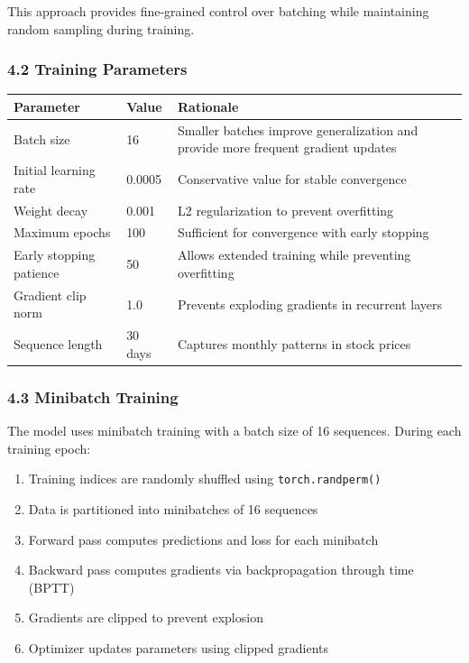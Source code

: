 \documentclass[
]{article}
\newcounter{none} %
\begin{document}
This approach provides fine-grained control over batching while
maintaining random sampling during training.

\subsubsection{4.2 Training Parameters}\label{42-training-parameters}

{\def\LTcaptype{none} %
\begin{longtable}[]{@{}lll@{}}
\toprule\noalign{}
Parameter & Value & Rationale \\
\midrule\noalign{}
\endhead
\bottomrule\noalign{}
\endlastfoot
Batch size & 16 & Smaller batches improve generalization and provide
more frequent gradient updates \\
Initial learning rate & 0.0005 & Conservative value for stable
convergence \\
Weight decay & 0.001 & L2 regularization to prevent overfitting \\
Maximum epochs & 100 & Sufficient for convergence with early stopping \\
Early stopping patience & 50 & Allows extended training while preventing
overfitting \\
Gradient clip norm & 1.0 & Prevents exploding gradients in recurrent
layers \\
Sequence length & 30 days & Captures monthly patterns in stock prices \\
\end{longtable}
}

\subsubsection{4.3 Minibatch Training}\label{43-minibatch-training}

The model uses minibatch training with a batch size of 16 sequences.
During each training epoch:

\begin{enumerate}
\def\labelenumi{\arabic{enumi}.}
\item
  Training indices are randomly shuffled using \texttt{torch.randperm()}
\item
  Data is partitioned into minibatches of 16 sequences
\item
  Forward pass computes predictions and loss for each minibatch
\item
  Backward pass computes gradients via backpropagation through time
  (BPTT)
\item
  Gradients are clipped to prevent explosion
\item
  Optimizer updates parameters using clipped gradients
\end{enumerate}
\end{document}
